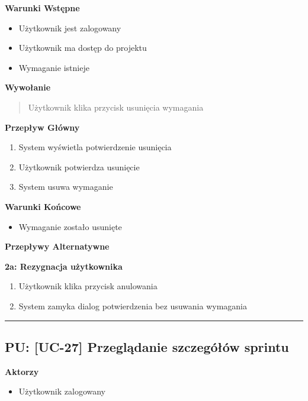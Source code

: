 \vspace{0.2cm}
\noindent\textbf{Warunki Wstępne}
\begin{itemize}
    \item Użytkownik jest zalogowany
    \item Użytkownik ma dostęp do projektu
    \item Wymaganie istnieje
\end{itemize}

\vspace{0.2cm}
\noindent\textbf{Wywołanie}
\begin{quote}
    Użytkownik klika przycisk usunięcia wymagania
\end{quote}

\vspace{0.2cm}
\noindent\textbf{Przepływ Główny}
\begin{enumerate}
    \item System wyświetla potwierdzenie usunięcia
    \item Użytkownik potwierdza usunięcie
    \item System usuwa wymaganie
\end{enumerate}

\vspace{0.2cm}
\noindent\textbf{Warunki Końcowe}
\begin{itemize}
    \item Wymaganie zostało usunięte
\end{itemize}

\vspace{0.2cm}
\noindent\textbf{Przepływy Alternatywne}

\textbf{2a: Rezygnacja użytkownika}
\begin{enumerate}
    \item Użytkownik klika przycisk anulowania
    \item System zamyka dialog potwierdzenia bez usuwania wymagania
\end{enumerate}


\hrule
\vspace{1cm}

\subsection*{PU: [UC-27] Przeglądanie szczegółów sprintu}

\noindent\textbf{Aktorzy}
\begin{itemize}
    \item Użytkownik zalogowany
\end{itemize}

